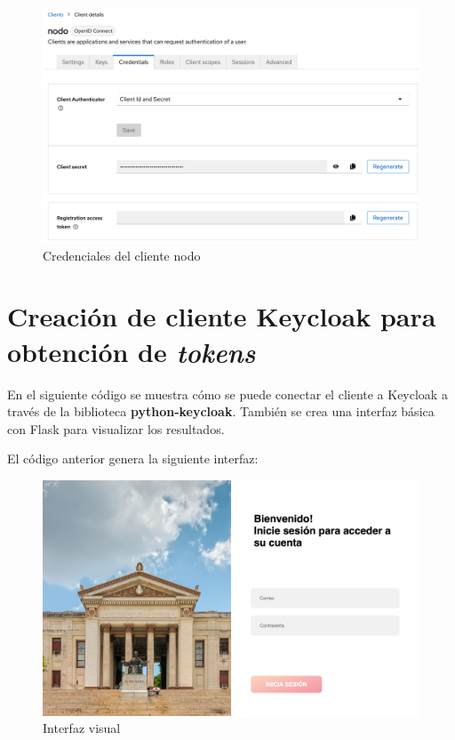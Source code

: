 \begin{figure}[H]
	\centering
	\includegraphics[width=0.9\linewidth]{Graphics/client_nodo_credentials}
	\caption{Credenciales del cliente nodo}
	\label{fig:clientnodocredentials}
\end{figure}


\section{Creación de cliente Keycloak para obtención de \textit{tokens}}

En el siguiente código se muestra cómo se puede conectar el cliente a Keycloak a través de la biblioteca \textbf{python-keycloak}. También se crea una interfaz básica con Flask para visualizar los resultados.




El código anterior genera la siguiente interfaz:

\begin{figure}[H]
	\centering
	\includegraphics[width=1\linewidth]{Graphics/interfaz}
	\caption{Interfaz visual}
	\label{fig:interfaz}
\end{figure}

